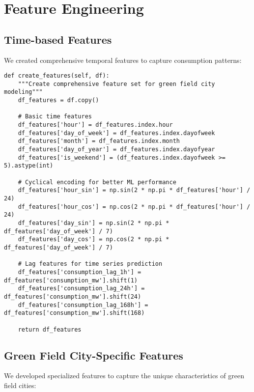 \documentclass[12pt,a4paper]{article}
\begin{document}
\section{Feature Engineering}

\subsection{Time-based Features}
We created comprehensive temporal features to capture consumption patterns:

\begin{lstlisting}[caption={Time-based Feature Creation}]
def create_features(self, df):
    """Create comprehensive feature set for green field city modeling"""
    df_features = df.copy()
    
    # Basic time features
    df_features['hour'] = df_features.index.hour
    df_features['day_of_week'] = df_features.index.dayofweek
    df_features['month'] = df_features.index.month
    df_features['day_of_year'] = df_features.index.dayofyear
    df_features['is_weekend'] = (df_features.index.dayofweek >= 5).astype(int)
    
    # Cyclical encoding for better ML performance
    df_features['hour_sin'] = np.sin(2 * np.pi * df_features['hour'] / 24)
    df_features['hour_cos'] = np.cos(2 * np.pi * df_features['hour'] / 24)
    df_features['day_sin'] = np.sin(2 * np.pi * df_features['day_of_week'] / 7)
    df_features['day_cos'] = np.cos(2 * np.pi * df_features['day_of_week'] / 7)
    
    # Lag features for time series prediction
    df_features['consumption_lag_1h'] = df_features['consumption_mw'].shift(1)
    df_features['consumption_lag_24h'] = df_features['consumption_mw'].shift(24)
    df_features['consumption_lag_168h'] = df_features['consumption_mw'].shift(168)
    
    return df_features
\end{lstlisting}

\subsection{Green Field City-Specific Features}
We developed specialized features to capture the unique characteristics of green field cities:
\end{document}
